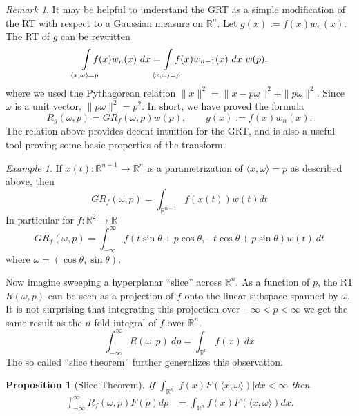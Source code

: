 \documentclass{amsart}
\newtheorem{proposition}[theorem]{Proposition}
\theoremstyle{remark}
\newtheorem{example}[theorem]{Example}
\newtheorem{remark}[theorem]{Remark}
\numberwithin{equation}{section}
\newcommand{\RR}{\mathbb{R}}
\def\mclimits_#1{\limits_{\mathclap{#1}}}
\begin{document}
\begin{remark}
It may be helpful to understand the GRT as a simple modification of the RT with respect to a Gaussian measure on $\RR^n$. Let $g(x) := f(x)w_n(x)$. The RT of $g$ can be rewritten
\begin{align*}
    \int\mclimits_{\langle x, \omega \rangle = p} f(x) w_n(x) ~dx
    &= \int\mclimits_{\langle x, \omega \rangle = p} f(x) w_{n-1}(x) ~dx~ w(p),
\end{align*}
where we used the Pythagorean relation $\|x\|^2 = \|x - p\omega\|^2 + \|p\omega\|^2$. Since $\omega$ is a unit vector, $\|p\omega\|^2 = p^2$. In short, we have proved the formula
\begin{equation}
    \label{eq:GRTPythag}
    R_g(\omega, p) = GR_f(\omega, p) w(p), \qquad g(x) := f(x)w_n(x).
\end{equation}
The relation above provides decent intuition for the GRT, and is also a useful tool proving some basic properties of the transform.
\end{remark}

\begin{example}
If $x(t):\RR^{n-1} \longrightarrow \RR^n$ is a parametrization of $\langle x, \omega\rangle = p$ as described above, then
\[
    GR_f(\omega, p) = \int_{\RR^{n-1}}f(x(t)) w(t) dt
\]
In particular for $f:\RR^2 \rightarrow \RR$
\[
    GR_f(\omega, p) = \int_{-\infty}^\infty f(t \sin \theta + p \cos \theta, -t \cos \theta + p \sin \theta) w(t)~dt
\]
where $\omega = (\cos \theta, \sin \theta)$.
\end{example}

Now imagine sweeping a hyperplanar ``slice'' across $\RR^n$. As a function of $p$, the RT $R(\omega, p)$ can be seen as a projection of $f$ onto the linear subspace spanned by $\omega$. It is not surprising that integrating this projection over $-\infty < p < \infty$ we get the same result as the $n$-fold integral of $f$ over $\RR^n$.
\[
    \int_{-\infty}^\infty R(\omega, p) ~dp = \int_{\RR^n} f(x) ~dx
\]
The so called ``slice theorem'' further generalizes this observation.
\begin{proposition}[Slice Theorem]
    If $\int_{\mathbb{R}^n} |f(x) F(\langle x, \omega \rangle)| dx < \infty$ then
    \begin{align}
        \label{eq:ST}
        \int_{-\infty}^\infty R_f(\omega, p) F(p) dp 
        &= \int_{\mathbb{R}^n} f(x) F(\langle x, \omega \rangle) dx.
    \end{align}
\end{proposition}
\end{document}
